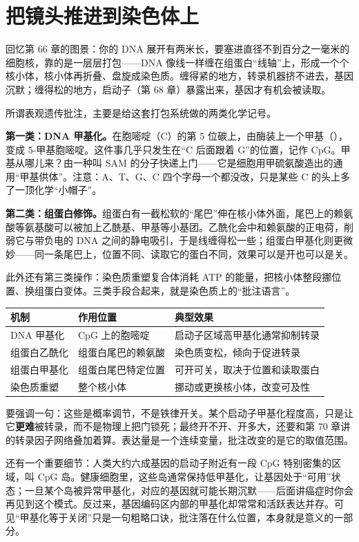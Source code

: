 \section{把镜头推进到染色体上}

回忆第 66 章的图景：你的 DNA 展开有两米长，要塞进直径不到百分之一毫米的细胞核，靠的是一层层打包——DNA 像线一样缠在组蛋白“线轴”上，形成一个个核小体，核小体再折叠、盘旋成染色质。缠得紧的地方，转录机器挤不进去，基因沉默；缠得松的地方，启动子（第 68 章）暴露出来，基因才有机会被读取。

所谓表观遗传批注，主要是给这套打包系统做的两类化学记号。

\textbf{第一类：DNA 甲基化。}在胞嘧啶（C）的第 5 位碳上，由酶装上一个甲基（），变成 5-甲基胞嘧啶。这件事几乎只发生在“C 后面跟着 G”的位置，记作 CpG。甲基从哪儿来？由一种叫 SAM 的分子快递上门——它是细胞用甲硫氨酸造出的通用“甲基供体”。注意：A、T、G、C 四个字母一个都没改，只是某些 C 的头上多了一顶化学“小帽子”。

\textbf{第二类：组蛋白修饰。}组蛋白有一截松软的“尾巴”伸在核小体外面，尾巴上的赖氨酸等氨基酸可以被加上乙酰基、甲基等小基团。乙酰化会中和赖氨酸的正电荷，削弱它与带负电的 DNA 之间的静电吸引，于是线缠得松一些；组蛋白甲基化则更微妙——同一条尾巴上，位置不同、读取它的蛋白不同，效果可以是开也可以是关。

此外还有第三类操作：染色质重塑复合体消耗 ATP 的能量，把核小体整段挪位置、换组蛋白变体。三类手段合起来，就是染色质上的“批注语言”。

\begin{table}[htbp]
\centering
\begin{tabular}{lll}
\toprule
机制 & 作用位置 & 典型效果 \\
\midrule
DNA 甲基化 & CpG 上的胞嘧啶 & 启动子区域高甲基化通常抑制转录 \\
组蛋白乙酰化 & 组蛋白尾巴的赖氨酸 & 染色质变松，倾向于促进转录 \\
组蛋白甲基化 & 组蛋白尾巴特定位置 & 可开可关，取决于位置和读取蛋白 \\
染色质重塑 & 整个核小体 & 挪动或更换核小体，改变可及性 \\
\bottomrule
\end{tabular}
\end{table}

要强调一句：这些是概率调节，不是铁律开关。某个启动子甲基化程度高，只是让它\textbf{更难}被转录，而不是物理上把门锁死；最终开不开、开多大，还要和第 70 章讲的转录因子网络叠加着算。表达量是一个连续变量，批注改变的是它的取值范围。

还有一个重要细节：人类大约六成基因的启动子附近有一段 CpG 特别密集的区域，叫 CpG 岛。健康细胞里，这些岛通常保持低甲基化，让基因处于“可用”状态；一旦某个岛被异常甲基化，对应的基因就可能长期沉默——后面讲癌症时你会再见到这个模式。反过来，基因编码区内部的甲基化却常常和活跃表达并存。可见“甲基化等于关闭”只是一句粗略口诀，批注落在什么位置，本身就是意义的一部分。

